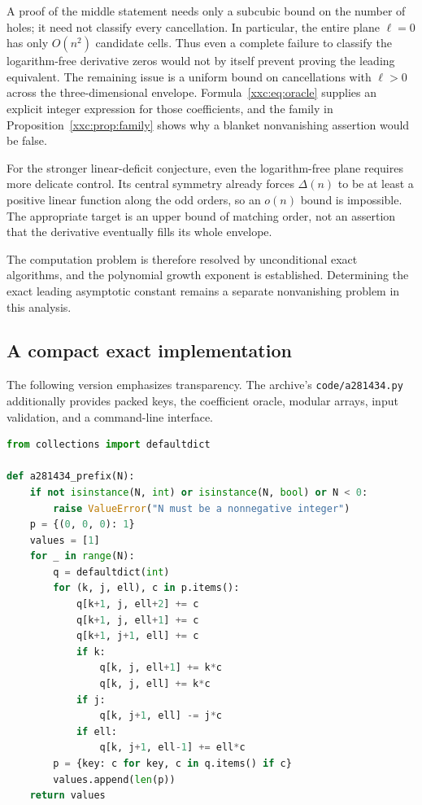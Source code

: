 \documentclass[11pt,a4paper]{article}
\numberwithin{equation}{section}
\theoremstyle{definition}
\theoremstyle{remark}
\theoremstyle{plain}
\begin{document}
A proof of the middle statement needs only a subcubic bound on the number
of holes; it need not classify every cancellation. In particular, the
entire plane $\ell=0$ has only $O(n^2)$ candidate cells. Thus even a complete
failure to classify the logarithm-free derivative zeros would not by itself
prevent proving the leading equivalent. The remaining issue is a uniform
bound on cancellations with $\ell>0$ across the three-dimensional envelope.
Formula~\eqref{xxc:eq:oracle} supplies an explicit integer expression for those
coefficients, and the family in Proposition~\ref{xxc:prop:family} shows why a
blanket nonvanishing assertion would be false.

For the stronger linear-deficit conjecture, even the logarithm-free plane
requires more delicate control. Its central symmetry already forces
$\Delta(n)$ to be at least a positive linear function along the odd orders,
so an $o(n)$ bound is impossible. The appropriate target is an upper bound
of matching order, not an assertion that the derivative eventually fills
its whole envelope.

The computation problem is therefore resolved by unconditional exact
algorithms, and the polynomial growth exponent is established. Determining
the exact leading asymptotic constant remains a separate nonvanishing
problem in this analysis.

\subsection{A compact exact implementation}\label{xxc:app:code}

The following version emphasizes transparency. The archive's
\texttt{code/a281434.py} additionally provides packed keys, the coefficient
oracle, modular arrays, input validation, and a command-line interface.

\begin{lstlisting}[language=Python]
from collections import defaultdict

def a281434_prefix(N):
    if not isinstance(N, int) or isinstance(N, bool) or N < 0:
        raise ValueError("N must be a nonnegative integer")
    p = {(0, 0, 0): 1}
    values = [1]
    for _ in range(N):
        q = defaultdict(int)
        for (k, j, ell), c in p.items():
            q[k+1, j, ell+2] += c
            q[k+1, j, ell+1] += c
            q[k+1, j+1, ell] += c
            if k:
                q[k, j, ell+1] += k*c
                q[k, j, ell] += k*c
            if j:
                q[k, j+1, ell] -= j*c
            if ell:
                q[k, j+1, ell-1] += ell*c
        p = {key: c for key, c in q.items() if c}
        values.append(len(p))
    return values
\end{lstlisting}
\end{document}
